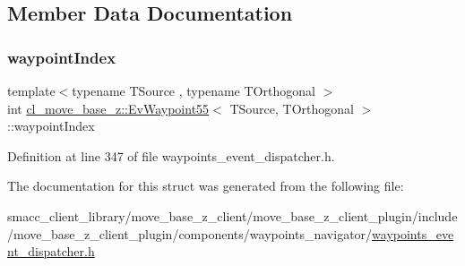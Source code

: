 \subsection{Member Data Documentation}
\mbox{\label{structcl__move__base__z_1_1EvWaypoint55_aba8b7d968f89a9564deb7a023bf5798f}} 
\subsubsection{\texorpdfstring{waypoint\+Index}{waypointIndex}}
{\footnotesize\ttfamily template$<$typename T\+Source , typename T\+Orthogonal $>$ \\
int \hyperlink{structcl__move__base__z_1_1EvWaypoint55}{cl\+\_\+move\+\_\+base\+\_\+z\+::\+Ev\+Waypoint55}$<$ T\+Source, T\+Orthogonal $>$\+::waypoint\+Index}



Definition at line 347 of file waypoints\+\_\+event\+\_\+dispatcher.\+h.



The documentation for this struct was generated from the following file\+:\begin{DoxyCompactItemize}
\item 
smacc\+\_\+client\+\_\+library/move\+\_\+base\+\_\+z\+\_\+client/move\+\_\+base\+\_\+z\+\_\+client\+\_\+plugin/include/move\+\_\+base\+\_\+z\+\_\+client\+\_\+plugin/components/waypoints\+\_\+navigator/\hyperlink{waypoints__event__dispatcher_8h}{waypoints\+\_\+event\+\_\+dispatcher.\+h}\end{DoxyCompactItemize}
